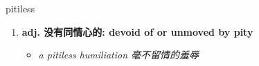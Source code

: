 
\begin{frame}
{\huge pitiless}
\begin{center}
\begin{enumerate}\Large
  \item \textbf{adj. 没有同情心的: devoid of or unmoved by pity}
  \begin{itemize}
    \item \em{\Large{a pitiless humiliation 毫不留情的羞辱}}
  \end{itemize}
\end{enumerate}
\end{center}
\end{frame}
